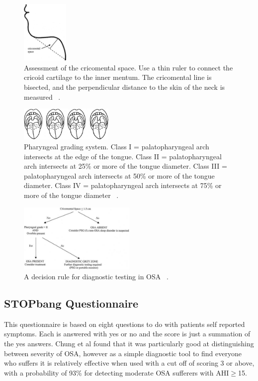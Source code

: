 \begin{figure}[h]
\centering 
\includegraphics[width=0.2\textwidth]{drawings/cricomental}
\caption{Assessment of the cricomental space. Use a thin ruler to connect the cricoid cartilage to the inner mentum. The cricomental line is bisected, and the perpendicular distance to the skin of the neck is measured ~\cite{tsai2003decision}.}
\label{fig:cricomental}
\end{figure}
\begin{figure}[h]
\centering 
\includegraphics[width=0.4\textwidth]{drawings/pharyngeal}
\caption{Pharyngeal grading system. Class I = palatopharyngeal arch intersects at the edge of the tongue. Class II = palatopharyngeal arch intersects at 25\% or more of the tongue diameter. Class III = palatopharyngeal arch intersects at 50\% or more of the tongue diameter. Class IV = palatopharyngeal arch intersects at 75\% or more of the tongue diameter ~\cite{tsai2003decision}.}
\label{fig:pharyngeal}
\end{figure}
\begin{figure}[h]
\centering 
\includegraphics[width=0.5\textwidth]{drawings/flowchart}
\caption{A decision rule for diagnostic testing in OSA ~\cite{tsai2003decision}.}
\label{fig:flowchart}
\end{figure}


\subsection{STOPbang Questionnaire}
This questionnaire is based on eight questions to do with patients self reported symptoms. Each is answered with yes or no and the score is just a summation of the yes answers. Chung et al found that it was particularly good at distinguishing between severity of OSA, however as a simple diagnostic tool to find everyone who suffers it is relatively effective when used with a cut off of scoring 3 or above, with a probability of 93\% for detecting moderate OSA sufferers with AHI$\geq$15.

